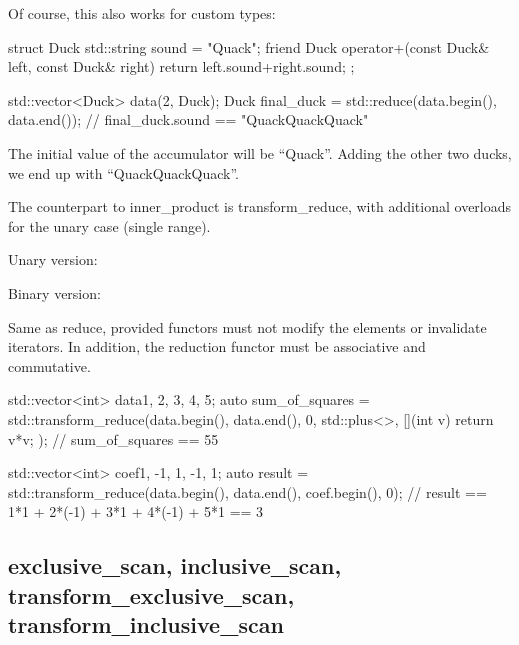 Of course, this also works for custom types:

\begin{box-note}
\begin{cppcode}
struct Duck {
    std::string sound = "Quack";
    friend Duck operator+(const Duck& left, const Duck& right) {
        return {left.sound+right.sound};
    }
};

std::vector<Duck> data(2, Duck{});
Duck final_duck = std::reduce(data.begin(), data.end());
// final_duck.sound == "QuackQuackQuack"
\end{cppcode}
\end{box-note}

The initial value of the accumulator will be “Quack”. Adding the other two ducks, we end up with “QuackQuackQuack”.

The counterpart to inner\_product is transform\_reduce, with additional overloads for the unary case (single range).


Unary version:


Binary version:


Same as reduce, provided functors must not modify the elements or invalidate iterators. In addition, the reduction functor must be associative and commutative.

\begin{box-note}
\begin{cppcode}
std::vector<int> data{1, 2, 3, 4, 5};
auto sum_of_squares = std::transform_reduce(data.begin(), data.end(), 0, 
                                            std::plus<>{}, [](int v) { return v*v; });
// sum_of_squares == 55

std::vector<int> coef{1, -1, 1, -1, 1};
auto result = std::transform_reduce(data.begin(), data.end(), coef.begin(), 0);
// result == 1*1 + 2*(-1) + 3*1 + 4*(-1) + 5*1 == 3
\end{cppcode}
\end{box-note}

\subsection{exclusive\_scan, inclusive\_scan, transform\_exclusive\_scan, transform\_inclusive\_scan}

